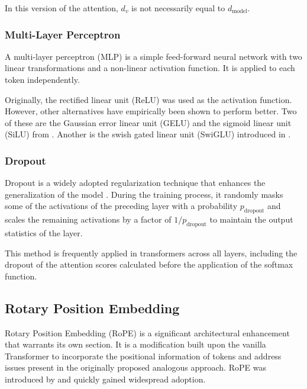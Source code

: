 In this version of the attention, \(d_v\) is not necessarily equal to \(d_{\mathrm{model}}\).

\subsubsection*{Multi-Layer Perceptron}

A multi-layer perceptron (MLP) is a simple feed-forward neural network with two linear transformations and a non-linear activation function. It is applied to each token independently.

Originally, the rectified linear unit (ReLU) was used as the activation function. However, other alternatives have empirically been shown to perform better. Two of these are the Gaussian error linear unit (GELU) and the sigmoid linear unit (SiLU) from \citet{hendrycks2023}. Another is the swish gated linear unit (SwiGLU) introduced in \citet{shazeer2020}.

\subsubsection*{Dropout}

Dropout is a widely adopted regularization technique that enhances the generalization of the model \parencite{srivastava2014}. During the training process, it randomly masks some of the activations of the preceding layer with a probability \(p_{\mathrm{dropout}}\) and scales the remaining activations by a factor of \(1 / p_{\mathrm{dropout}}\) to maintain the output statistics of the layer.

This method is frequently applied in transformers across all layers, including the dropout of the attention scores calculated before the application of the softmax function.

\subsection{Rotary Position Embedding}\label{sec:rotary-position-embedding}

Rotary Position Embedding (RoPE) is a significant architectural enhancement that warrants its own section. It is a modification built upon the vanilla Transformer to incorporate the positional information of tokens and address issues present in the originally proposed analogous approach. RoPE was introduced by \citet{su2021} and quickly gained widespread adoption.

